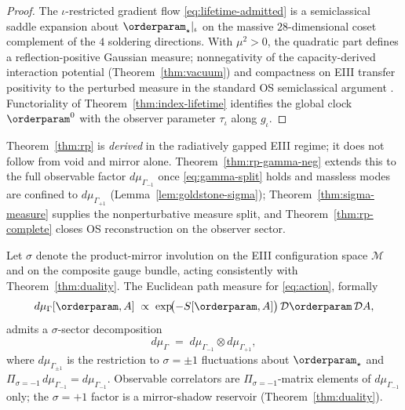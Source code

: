 \begin{proof}
The $\iota$-restricted gradient flow \eqref{eq:lifetime-admitted} is a
semiclassical saddle expansion about $\orderparam_\star|_\iota$ on the massive
$28$-dimensional coset complement of the $4$ soldering directions. With
$\mu^2>0$, the quadratic part defines a reflection-positive Gaussian measure;
nonnegativity of the capacity-derived interaction potential
(Theorem~\ref{thm:vacuum}) and compactness on EIII transfer positivity to the
perturbed measure in the standard OS semiclassical argument
\cite{GlimmJaffe1987,OsterwalderSchrader1973}. Functoriality of
Theorem~\ref{thm:index-lifetime} identifies the global clock
$\orderparam^0$ with the observer parameter $\tau_\iota$ along $g_\iota$.
\end{proof}

\begin{remark}
Theorem~\ref{thm:rp} is \emph{derived} in the radiatively gapped EIII regime;
it does not follow from void and mirror alone. Theorem~\ref{thm:rp-gamma-neg}
extends this to the full observable factor $d\mu_{\Gamma_{-1}}$ once
\eqref{eq:gamma-split} holds and massless modes are confined to
$d\mu_{\Gamma_{+1}}$ (Lemma~\ref{lem:goldstone-sigma}); Theorem~\ref{thm:sigma-measure}
supplies the nonperturbative measure split, and Theorem~\ref{thm:rp-complete}
closes OS reconstruction on the observer sector.
\end{remark}

\begin{theorem}
\label{thm:sigma-measure}
Let $\sigma$ denote the product-mirror involution on the EIII configuration
space $\mathcal{M}$ and on the composite gauge bundle, acting consistently with
Theorem~\ref{thm:duality}. The Euclidean path measure for \eqref{eq:action},
formally
\begin{equation}\label{eq:gamma-full}
  d\mu_\Gamma[\orderparam,A]
  \;\propto\;
  \exp\!\bigl(-S[\orderparam,A]\bigr)\,\mathcal{D}\orderparam\,\mathcal{D}A,
\end{equation}
admits a $\sigma$-sector decomposition
\begin{equation}\label{eq:gamma-split}
  d\mu_\Gamma
  \;=\;
  d\mu_{\Gamma_{-1}}\otimes d\mu_{\Gamma_{+1}},
\end{equation}
where $d\mu_{\Gamma_{\pm1}}$ is the restriction to $\sigma=\pm1$
fluctuations about $\orderparam_\star$ and
$\Pi_{\sigma=-1}\,d\mu_{\Gamma_{-1}}=d\mu_{\Gamma_{-1}}$.
Observable correlators are $\Pi_{\sigma=-1}$-matrix elements of
$d\mu_{\Gamma_{-1}}$ only; the $\sigma=+1$ factor is a mirror-shadow
reservoir (Theorem~\ref{thm:duality}).
\end{theorem}

